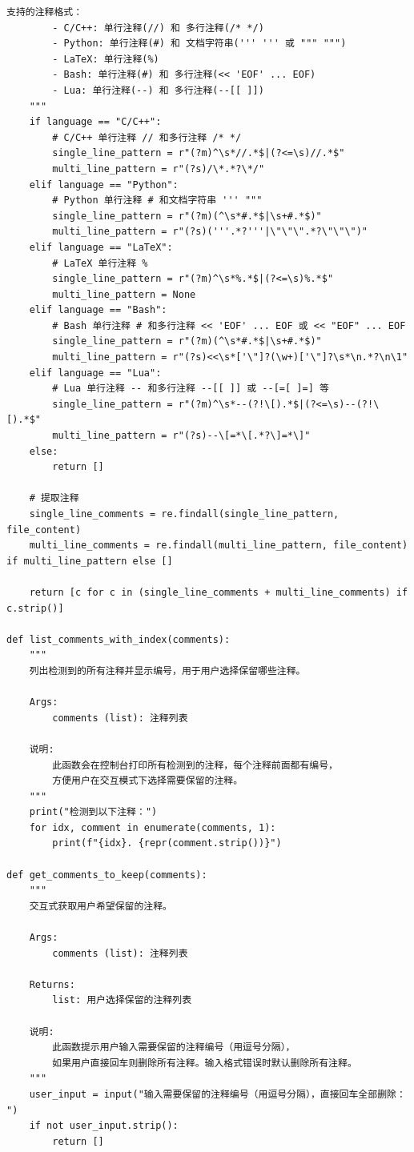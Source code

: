 \begin{lstlisting}[style=pythonstyle, title={递归删除整个文件夹中注释.py}]
    支持的注释格式：
        - C/C++: 单行注释(//) 和 多行注释(/* */)
        - Python: 单行注释(#) 和 文档字符串(''' ''' 或 """ """)
        - LaTeX: 单行注释(%)
        - Bash: 单行注释(#) 和 多行注释(<< 'EOF' ... EOF)
        - Lua: 单行注释(--) 和 多行注释(--[[ ]])
    """
    if language == "C/C++":
        # C/C++ 单行注释 // 和多行注释 /* */
        single_line_pattern = r"(?m)^\s*//.*$|(?<=\s)//.*$"
        multi_line_pattern = r"(?s)/\*.*?\*/"
    elif language == "Python":
        # Python 单行注释 # 和文档字符串 ''' """ 
        single_line_pattern = r"(?m)(^\s*#.*$|\s+#.*$)"
        multi_line_pattern = r"(?s)('''.*?'''|\"\"\".*?\"\"\")"
    elif language == "LaTeX":
        # LaTeX 单行注释 %
        single_line_pattern = r"(?m)^\s*%.*$|(?<=\s)%.*$"
        multi_line_pattern = None
    elif language == "Bash":
        # Bash 单行注释 # 和多行注释 << 'EOF' ... EOF 或 << "EOF" ... EOF
        single_line_pattern = r"(?m)(^\s*#.*$|\s+#.*$)"
        multi_line_pattern = r"(?s)<<\s*['\"]?(\w+)['\"]?\s*\n.*?\n\1"
    elif language == "Lua":
        # Lua 单行注释 -- 和多行注释 --[[ ]] 或 --[=[ ]=] 等
        single_line_pattern = r"(?m)^\s*--(?!\[).*$|(?<=\s)--(?!\[).*$"
        multi_line_pattern = r"(?s)--\[=*\[.*?\]=*\]"
    else:
        return []

    # 提取注释
    single_line_comments = re.findall(single_line_pattern, file_content)
    multi_line_comments = re.findall(multi_line_pattern, file_content) if multi_line_pattern else []

    return [c for c in (single_line_comments + multi_line_comments) if c.strip()]

def list_comments_with_index(comments):
    """
    列出检测到的所有注释并显示编号，用于用户选择保留哪些注释。
    
    Args:
        comments (list): 注释列表
        
    说明:
        此函数会在控制台打印所有检测到的注释，每个注释前面都有编号，
        方便用户在交互模式下选择需要保留的注释。
    """
    print("检测到以下注释：")
    for idx, comment in enumerate(comments, 1):
        print(f"{idx}. {repr(comment.strip())}")

def get_comments_to_keep(comments):
    """
    交互式获取用户希望保留的注释。
    
    Args:
        comments (list): 注释列表
        
    Returns:
        list: 用户选择保留的注释列表
        
    说明:
        此函数提示用户输入需要保留的注释编号（用逗号分隔），
        如果用户直接回车则删除所有注释。输入格式错误时默认删除所有注释。
    """
    user_input = input("输入需要保留的注释编号（用逗号分隔），直接回车全部删除： ")
    if not user_input.strip():
        return []


\end{lstlisting}
